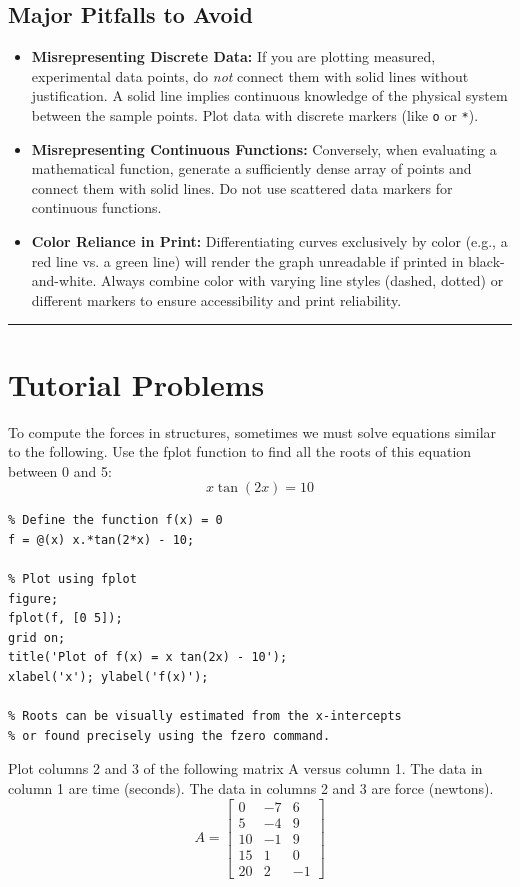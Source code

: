 \subsection{Major Pitfalls to Avoid}
\begin{itemize}
    \item \textbf{Misrepresenting Discrete Data:} If you are plotting measured, experimental data points, do \textit{not} connect them with solid lines without justification. A solid line implies continuous knowledge of the physical system between the sample points. Plot data with discrete markers (like \texttt{o} or \texttt{*}).
    \item \textbf{Misrepresenting Continuous Functions:} Conversely, when evaluating a mathematical function, generate a sufficiently dense array of points and connect them with solid lines. Do not use scattered data markers for continuous functions.
    \item \textbf{Color Reliance in Print:} Differentiating curves exclusively by color (e.g., a red line vs. a green line) will render the graph unreadable if printed in black-and-white. Always combine color with varying line styles (dashed, dotted) or different markers to ensure accessibility and print reliability.
\end{itemize}


\vspace{0.5cm}
\hrule

\section*{Tutorial Problems}
To compute the forces in structures, sometimes we must solve equations similar to the following. Use the fplot function to find all the roots of this equation between 0 and 5: 
$$x \tan(2x)=10$$

\begin{lstlisting}
% Define the function f(x) = 0
f = @(x) x.*tan(2*x) - 10;

% Plot using fplot
figure;
fplot(f, [0 5]);
grid on;
title('Plot of f(x) = x tan(2x) - 10');
xlabel('x'); ylabel('f(x)');

% Roots can be visually estimated from the x-intercepts
% or found precisely using the fzero command.
\end{lstlisting}

Plot columns 2 and 3 of the following matrix A versus column 1. The data in column 1 are time (seconds). 
The data in columns 2 and 3 are force (newtons). 
$$A=\begin{bmatrix}0&-7&6\\ 5&-4&9\\ 10&-1&9\\ 15&1&0\\ 20&2&-1\end{bmatrix}$$ 

